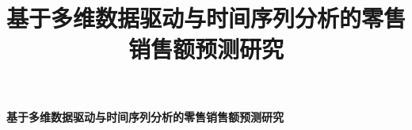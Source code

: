 \documentclass[withoutpreface,bwprint]{format}
\title{基于多维数据驱动与时间序列分析的零售销售额预测研究}
\begin{document}
{\centering{}\bfseries 基于多维数据驱动与时间序列分析的零售销售额预测研究\par}

\setcounter{page}{1}

\thispagestyle{empty}


\thispagestyle{empty}

\tableofcontents
\thispagestyle{empty}
\newpage

\setcounter{page}{1}

















\newpage


\newpage

\end{document}
